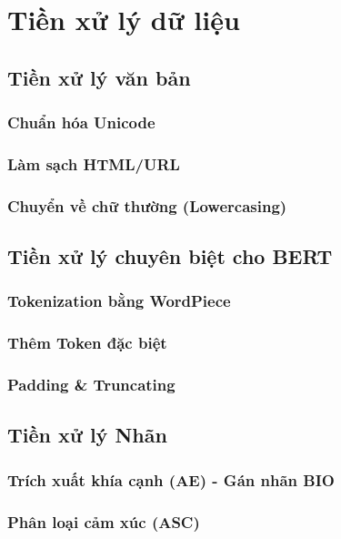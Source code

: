 \documentclass[12pt,a4paper]{report}
\begin{document}
\section{Tiền xử lý dữ liệu}

\subsection{Tiền xử lý văn bản}
\subsubsection{Chuẩn hóa Unicode}
\subsubsection{Làm sạch HTML/URL}

\subsubsection{Chuyển về chữ thường (Lowercasing)}

\subsection{Tiền xử lý chuyên biệt cho BERT}
\subsubsection{Tokenization bằng WordPiece}
\subsubsection{Thêm Token đặc biệt}

\subsubsection{Padding \& Truncating}



\subsection{Tiền xử lý Nhãn}

\subsubsection{Trích xuất khía cạnh (AE) - Gán nhãn BIO}

\subsubsection{Phân loại cảm xúc (ASC)}
\end{document}
